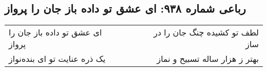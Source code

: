 \begin{center}
\section*{رباعی شماره ۹۳۸: ای عشق تو داده باز جان را پرواز}
\label{sec:0938}
\begin{longtable}{l p{0.5cm} r}
ای عشق تو داده باز جان را پرواز
&&
لطف تو کشیده چنگ جان را در ساز
\\
یک ذره عنایت تو ای بنده‌نواز
&&
بهتر ز هزار ساله تسبیح و نماز
\\
\end{longtable}
\end{center}
